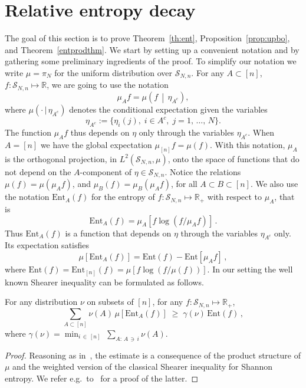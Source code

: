 \documentclass[AHL,Unicode,longabstracts,published]{cedram}
\renewcommand{\geq}{\;\geqslant\;}
\newcommand{\tc}{\, |\, }
\newcommand{\ent}{\mathrm{Ent}}
\newcommand{\cS}{\mathcal{S}}
\newcommand{\bbR}{\mathbb{R}}
\let\g=\gamma
\begin{document}
\section{Relative entropy decay}\label{sec:entdec}

The goal of this section is to prove Theorem~\ref{th:ent}, Proposition~\ref{prop:upbo}, and Theorem~\ref{entprodthm}. We start by setting up a convenient notation and by gathering some preliminary ingredients of the proof. To simplify our notation we write $\mu=\pi_N$ for the uniform distribution over $\cS_{N,n}$. For any $A\subset [n]$, $f:\cS_{N,n}\mapsto\bbR$, we are going to use the notation
\[
\mu_A f =\mu\left(f\,\middle|\,  \eta_{A^c}\right),
\]
where $\mu(\cdot\tc \eta_{A^c})$ denotes the conditional expectation given the variables
\[
\eta_{A^c}:=\{\eta_i(j), \;i\in A^c, \;j=1,\,\dots,\,N\}.
\]
The function $\mu_Af$ thus depends on $\eta$ only through the variables $\eta_{A^c}$. When $A=[n]$ we have the global expectation $\mu_{[n]} f = \mu(f)$. With this notation, $\mu_A$ is the orthogonal projection, in $L^2(\cS_{N,n},\mu)$, onto the space of functions that do not depend on the $A$-component of $\eta\in\cS_{N,n}$.
Notice the relations $\mu(f)=\mu(\mu_A f)$, and $\mu_B(f)=\mu_B(\mu_A f)$, for all $A\subset B\subset [n]$. We also use the notation $\ent_A(f)$ for the entropy of $f:\cS_{N,n}\mapsto\bbR_+$ with respect to $\mu_A$, that is
\begin{equation}\label{entA}
\ent_A(f) = \mu_A\left[f\log(f/\mu_A f)\right]\,.
\end{equation}
Thus $\ent_A(f)$ is a function that depends on $\eta$ through the variables $\eta_{A^c}$ only. Its expectation satisfies
\begin{equation}\label{entA2}
\mu\left[\ent_A(f)\right] = \ent(f) - \ent[\mu_Af]\,,
\end{equation}
where $\ent(f) = \ent_{[n]}(f) = \mu\left[f\log(f/\mu (f))\right]$. In our setting the well known Shearer inequality can be formulated as follows.

\begin{lemm}\label{lem:shearer}
For any distribution $\nu$ on subsets of $[n]$, for any $f:\cS_{N,n}\mapsto\bbR_+$,
\begin{equation}\label{shearer}
\sum_{A\subset [n]}\nu(A) \,\mu\left[\ent_A(f)\right] \geq \g(\nu)\, \ent(f)\,,
\end{equation}
where $\g(\nu) = \min_{i\,\in\,[n]}\;\sum_{A:\,A\,\ni\,i}\nu(A)$.
\end{lemm}

\begin{proof}
Reasoning as in~\cite[Proposition~4.3]{entprod}, the estimate is a consequence of the product structure of $\mu$ and the weighted version of the classical Shearer inequality for Shannon entropy. We refer e.g.\ to~\cite{Virag} for a proof of the latter.
\end{proof}
\end{document}

